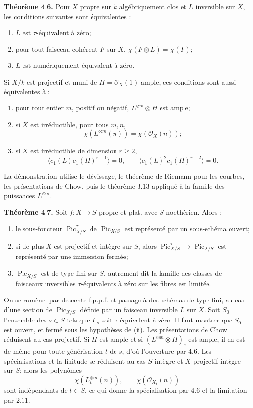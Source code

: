 \documentclass[11pt]{article}
\providecommand{\Pic}{\operatorname{Pic}}
\begin{document}
\textbf{Th\'eor\`eme 4.6.} Pour $X$ propre sur $k$ alg\'ebriquement clos et $L$ inversible sur $X$, les conditions suivantes sont \'equivalentes :
\begin{enumerate}[label=\roman*)]
\item $L$ est $\tau$-\'equivalent \`a z\'ero;
\item pour tout faisceau coh\'erent $F$ sur $X$, $\chi(F\otimes L)=\chi(F)$;
\item $L$ est num\'eriquement \'equivalent \`a z\'ero.
\end{enumerate}
Si $X/k$ est projectif et muni de $H=\mathcal O_X(1)$ ample, ces conditions sont aussi \'equivalentes \`a :
\begin{enumerate}[label=\roman*),start=4]
\item pour tout entier $m$, positif ou n\'egatif, $L^{\otimes m}\otimes H$ est ample;
\item si $X$ est irr\'eductible, pour tous $m,n$,
\[
 \chi(L^{\otimes m}(n))=\chi(\mathcal O_X(n));
\]
\item si $X$ est irr\'eductible de dimension $r\ge2$,
\[
 \langle c_1(L)c_1(H)^{r-1}\rangle=0,
 \qquad
 \langle c_1(L)^2c_1(H)^{r-2}\rangle=0.
\]
\end{enumerate}
La d\'emonstration utilise le d\'evissage, le th\'eor\`eme de Riemann pour les courbes, les pr\'esentations de Chow, puis le th\'eor\`eme 3.13 appliqu\'e \`a la famille des puissances $L^{\otimes m}$.

\textbf{Th\'eor\`eme 4.7.} Soit $f:X\to S$ propre et plat, avec $S$ noeth\'erien. Alors :
\begin{enumerate}[label=\roman*)]
\item le sous-foncteur $\Pic^\tau_{X/S}$ de $\Pic_{X/S}$ est repr\'esent\'e par un sous-sch\'ema ouvert;
\item si de plus $X$ est projectif et int\`egre sur $S$, alors $\Pic^\tau_{X/S}\to\Pic_{X/S}$ est repr\'esent\'e par une immersion ferm\'ee;
\item $\Pic^\tau_{X/S}$ est de type fini sur $S$, autrement dit la famille des classes de faisceaux inversibles $\tau$-\'equivalents \`a z\'ero sur les fibres est limit\'ee.
\end{enumerate}
On se ram\`ene, par descente f.p.p.f. et passage \`a des sch\'emas de type fini, au cas d'une section de $\Pic_{X/S}$ d\'efinie par un faisceau inversible $L$ sur $X$. Soit $S_0$ l'ensemble des $s\in S$ tels que $L_s$ soit $\tau$-\'equivalent \`a z\'ero. Il faut montrer que $S_0$ est ouvert, et ferm\'e sous les hypoth\`eses de (ii). Les pr\'esentations de Chow r\'eduisent au cas projectif. Si $H$ est ample et si $(L^{\otimes m}\otimes H)_s$ est ample, il en est de m\^eme pour toute g\'en\'erisation $t$ de $s$, d'o\`u l'ouverture par 4.6. Les sp\'ecialisations et la finitude se r\'eduisent au cas $S$ int\`egre et $X$ projectif int\`egre sur $S$; alors les polyn\^omes
\[
 \chi(L_t^{\otimes m}(n)),\qquad \chi(\mathcal O_{X_t}(n))
\]
sont ind\'ependants de $t\in S$, ce qui donne la sp\'ecialisation par 4.6 et la limitation par 2.11.
\end{document}
